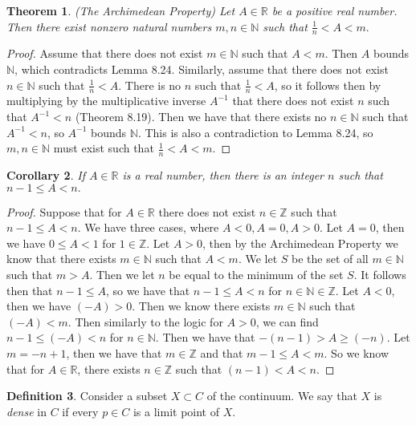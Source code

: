 \documentclass[12pt]{article}
\newcommand{\bbN}{\mathbb{N}}
\newcommand{\bbR}{\mathbb{R}}
\newcommand{\bbZ}{\mathbb{Z}}
\renewcommand{\_}[1]{\underline{ #1 }}
\newtheorem{theorem}{Theorem}[section]
\newtheorem{corollary}[theorem]{Corollary}
\theoremstyle{definition}
\newtheorem{definition}[theorem]{Definition}
\numberwithin{equation}{subsection}
\begin{document}
\begin{theorem} (The Archimedean Property) Let $A\in\bbR$ be a positive real number. Then there exist nonzero natural numbers $m,n\in\bbN$ such that $\frac1n<A<m.$
\end{theorem}

\begin{proof}
Assume that there does not exist $m \in \bbN$ such that $A < m$. Then $A$ bounds $\bbN$, which contradicts Lemma 8.24. Similarly, assume that there does not exist $n \in \bbN$ such that $\frac{1}{n} < A$. There is no $n$ such that $\frac{1}{n} < A$, so it follows then by multiplying by the multiplicative inverse $A^{-1}$  that there does not exist $n$ such that $A^{-1} < n$ (Theorem 8.19). Then we have that there exists no $n \in \bbN$ such that $A^{-1} < n$, so $A^{-1}$ bounds $\bbN$. This is also a contradiction to Lemma 8.24, so $m,n \in \bbN$ must exist such that $\frac{1}{n} < A < m$.
\end{proof}

\begin{corollary} If $A\in\bbR$ is a real number, then there is an integer $n$ such that 
$n-1\leq A<n.$
\end{corollary}

\begin{proof}
Suppose that for $A \in \bbR$ there does not exist $n \in \bbZ$ such that $n - 1 \leq A < n$. We have three cases, where $A < 0, A = 0, A >0$. \newline
Let $A = 0$, then we have $0 \leq A < 1$ for $1 \in \bbZ$. \newline
Let $A > 0$, then by the Archimedean Property we know that there exists $m \in \bbN$ such that $A < m$. We let $S$ be the set of all $m \in \bbN$ such that $m > A$. Then we let $n$ be equal to the minimum of the set $S$. It follows then that $n - 1 \leq A$, so we have that $n - 1 \leq A < n$ for $n \in \bbN \in \bbZ$. \newline
Let $A < 0$, then we have $(-A) > 0$. Then we know there exists $m \in \bbN$ such that $(-A) < m$. Then similarly to the logic for $A > 0$, we can find $n - 1 \leq (-A) < n$ for $n \in \bbN$. Then we have that $-(n - 1) > A \geq (-n)$. Let $m = -n + 1$, then we have that $m \in \bbZ$ and that $m - 1 \leq A < m$. \newline
So we know that for $A \in \bbR$, there exists $n \in \bbZ$ such that $(n - 1) < A < n$.
\end{proof}

\begin{definition} Consider a subset $X\subset C$ of the continuum. We say that $X$ is {\it dense} in $C$ if every $p\in C $ is a limit point of $X.$
\end{definition}
\end{document}
